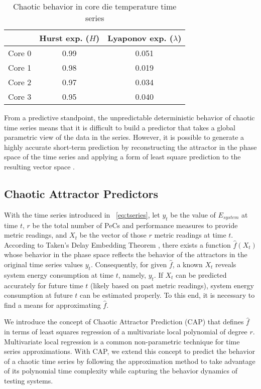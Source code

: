 \begin{table}[tbhp]
\caption{Chaotic behavior in core die temperature time series}
\label{tab:chaotictemp} 
\centering 
\begin{tabular}{lcc}
\hline
\hline
 & Hurst exp. ($H$) & Lyaponov exp. ($\lambda$) \\
\hline
Core 0 & 0.99 & 0.051 \\
Core 1 & 0.98 & 0.019 \\
Core 2 & 0.97 & 0.034 \\
Core 3 & 0.95 & 0.040 \\
\hline
\end{tabular}
\end{table} 

From a predictive standpoint, the unpredictable deterministic behavior
of chaotic time series means that it is difficult to build a predictor
that takes a global parametric view of the data in the series.  However,
it is possible to generate a highly accurate short-term prediction by
reconstructing the attractor in the phase space of the time series and
applying a form of least square prediction to the resulting vector space
\cite{Itoh1995,Su2010}.

\subsection{Chaotic Attractor Predictors}
\label{sec:capps}
With the time series introduced in \equationname~\eqref{eq:tseries}, let $y_{t}$ be
the value of $E_{system}$ at time $t$, $r$ be the total number of PeCs and
performance measures to provide metric readings,
and $X_{t}$ be the vector of those $r$ metric readings at time $t$.
According to Taken's Delay Embedding Theorem \cite{Sprott2003},
there exists a function $\hat{f}(X_{t})$ whose behavior in the phase
space reflects the behavior of the attractors in the original time
series values $y_{t}$.
Consequently, for given $\hat{f}$, a known $X_{t}$ reveals system energy
consumption at time $t$, namely, $y_{t}$.
If $X_{t}$ can be predicted accurately for future time $t$
(likely based on past metric readings), system energy consumption
at future $t$ can be estimated properly.
To this end, it is necessary to find a means for approximating $\hat{f}$.

We introduce the concept of Chaotic Attractor Prediction (CAP) that
defines $\hat{f}$ in terms of least squares regression of a
multivariate local polynomial of degree $r$.  Multivariate local 
regression is a common non-parametric technique for time series
approximations.  With CAP, we extend this concept to predict the
behavior of a chaotic time series by following the approximation method
to take advantage of its polynomial time complexity while capturing the behavior
dynamics of testing systems.

